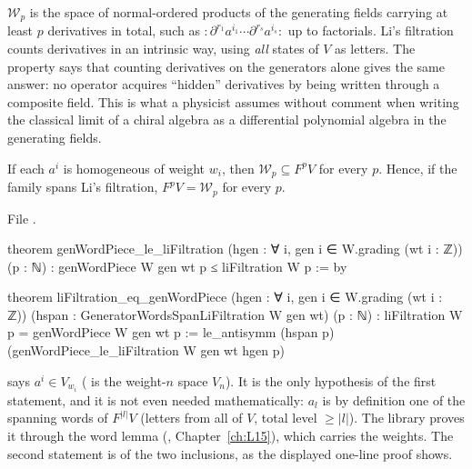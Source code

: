 \begin{physics}
$\mathcal W_p$ is the space of normal-ordered products of the generating fields carrying at least $p$ derivatives in total,
such as ${:}\partial^{r_1}a^{i_1}\cdots\partial^{r_s}a^{i_s}{:}$ up to factorials. Li's filtration counts derivatives
in an intrinsic way, using \emph{all} states of $V$ as letters. The property says that counting derivatives on
the generators alone gives the same answer: no operator acquires ``hidden'' derivatives by being written through a
composite field. This is what a physicist assumes without comment when writing the classical limit of a chiral
algebra as a differential polynomial algebra in the generating fields.
\end{physics}

\begin{proposition}\label{l11:prop:wordpieceli}
If each $a^i$ is homogeneous of weight $w_i$, then $\mathcal W_p\subseteq F^pV$ for every $p$. Hence, if the family spans Li's
filtration, $F^pV = \mathcal W_p$ for every $p$.
\end{proposition}
\noindent File .
\begin{leancode}
theorem genWordPiece_le_liFiltration (hgen : ∀ i, gen i ∈ W.grading (wt i : ℤ)) (p : ℕ) :
    genWordPiece W gen wt p ≤ liFiltration W p := by

theorem liFiltration_eq_genWordPiece (hgen : ∀ i, gen i ∈ W.grading (wt i : ℤ))
    (hspan : GeneratorWordsSpanLiFiltration W gen wt) (p : ℕ) :
    liFiltration W p = genWordPiece W gen wt p :=
  le_antisymm (hspan p) (genWordPiece_le_liFiltration W gen wt hgen p)
\end{leancode}

\begin{dictionary}
 says $a^i\in V_{w_i}$ ( is the weight-$n$ space $V_n$). It is the only hypothesis of
the first statement, and it is not even needed mathematically: $a_l$ is by definition one of the spanning words of
$F^{|l|}V$ (letters from all of $V$, total level $\ge|l|$). The library proves it through the word lemma
 (, Chapter~\ref{ch:L15}), which carries the weights. The second statement is
 of the two inclusions, as the displayed one-line proof shows.
\end{dictionary}

